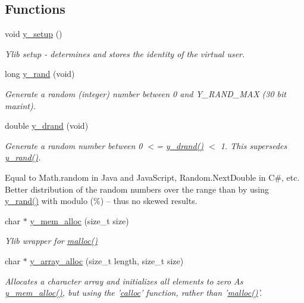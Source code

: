 \subsection*{Functions}
\begin{DoxyCompactItemize}
\item 
void \hyperlink{group__core_ga7350ca6bb0383b2169ef4eaae3b091e7}{y\-\_\-setup} ()
\begin{DoxyCompactList}\small\item\em Ylib setup -\/ determines and stores the identity of the virtual user. \end{DoxyCompactList}\item 
long \hyperlink{group__core_ga0419985b32761cce3f5d75e6aad36f05}{y\-\_\-rand} (void)
\begin{DoxyCompactList}\small\item\em Generate a random (integer) number between 0 and Y\-\_\-\-R\-A\-N\-D\-\_\-\-M\-A\-X (30 bit maxint). \end{DoxyCompactList}\item 
double \hyperlink{group__core_ga319710d6642f34a8ea51a1a9898869fc}{y\-\_\-drand} (void)
\begin{DoxyCompactList}\small\item\em Generate a random number between 0 $<$= \hyperlink{group__core_ga319710d6642f34a8ea51a1a9898869fc}{y\-\_\-drand()} $<$ 1. This supersedes \hyperlink{group__core_ga0419985b32761cce3f5d75e6aad36f05}{y\-\_\-rand()}. \par
Equal to Math.\-random in Java and Java\-Script, Random.\-Next\-Double in C\#, etc. Better distribution of the random numbers over the range than by using \hyperlink{group__core_ga0419985b32761cce3f5d75e6aad36f05}{y\-\_\-rand()} with modulo (\%) -- thus no skewed results. \end{DoxyCompactList}\item 
char $\ast$ \hyperlink{group__core_ga71b54880fd4fe004b3cb8141255c6474}{y\-\_\-mem\-\_\-alloc} (size\-\_\-t size)
\begin{DoxyCompactList}\small\item\em Ylib wrapper for \hyperlink{group__memory_ga5f1a5df9b8c50bd259b8c34c0056e304}{malloc()} \end{DoxyCompactList}\item 
char $\ast$ \hyperlink{group__core_ga084a530700465b1a7a10d103f2a2e6d4}{y\-\_\-array\-\_\-alloc} (size\-\_\-t length, size\-\_\-t size)
\begin{DoxyCompactList}\small\item\em Allocates a character array and initializes all elements to zero As \hyperlink{group__core_ga71b54880fd4fe004b3cb8141255c6474}{y\-\_\-mem\-\_\-alloc()}, but using the '\hyperlink{group__memory_gae201ae1031fe85000b4e22abb3a824b2}{calloc}' function, rather than '\hyperlink{group__memory_ga5f1a5df9b8c50bd259b8c34c0056e304}{malloc()}'. \end{DoxyCompactList}\item 

\end{DoxyCompactItemize}
